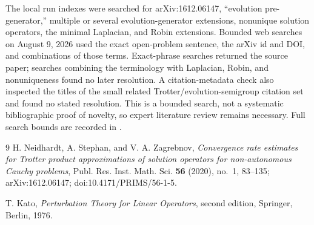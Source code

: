 \documentclass[11pt]{article}
\begin{document}
The local run indexes were searched for arXiv:1612.06147, ``evolution
pre-generator,'' multiple or several evolution-generator extensions,
nonunique solution operators, the minimal Laplacian, and Robin extensions.
Bounded web searches on August 9, 2026 used the exact open-problem sentence,
the arXiv id and DOI, and combinations of those terms.  Exact-phrase searches
returned the source paper; searches combining the terminology with Laplacian,
Robin, and nonuniqueness found no later resolution.  A citation-metadata check
also inspected the titles of the small related Trotter/evolution-semigroup
citation set and found no stated resolution.  This is a bounded search, not a
systematic bibliographic proof of novelty, so expert literature review remains
necessary.  Full search bounds are recorded in .

\begin{thebibliography}{9}
H. Neidhardt, A. Stephan, and V. A. Zagrebnov,
\emph{Convergence rate estimates for Trotter product approximations of
solution operators for non-autonomous Cauchy problems},
Publ. Res. Inst. Math. Sci. \textbf{56} (2020), no.~1, 83--135;
arXiv:1612.06147; doi:10.4171/PRIMS/56-1-5.

T. Kato,
\emph{Perturbation Theory for Linear Operators}, second edition,
Springer, Berlin, 1976.
\end{thebibliography}
\end{document}
